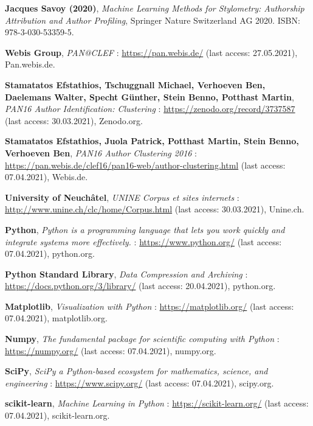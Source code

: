 \begin{thebibliography}{9}
\textbf{Jacques Savoy (2020)},
\textit{Machine Learning Methods for Stylometry: Authorship Attribution and Author Profiling},
Springer Nature Switzerland AG 2020. ISBN: 978-3-030-53359-5.


\textbf{Webis Group},
\textit{PAN@CLEF} : \url{https://pan.webis.de/} (last access: 27.05.2021),
Pan.webis.de.

\textbf{Stamatatos Efstathios, Tschuggnall Michael, Verhoeven Ben, Daelemans Walter, Specht Günther, Stein Benno, Potthast Martin},
\textit{PAN16 Author Identification: Clustering} : \url{https://zenodo.org/record/3737587} (last access: 30.03.2021),
Zenodo.org.

\textbf{Stamatatos Efstathios, Juola Patrick, Potthast Martin, Stein Benno, Verhoeven Ben},
\textit{PAN16 Author Clustering 2016} : \url{https://pan.webis.de/clef16/pan16-web/author-clustering.html} (last access: 07.04.2021),
Webis.de.

\textbf{University of Neuchâtel},
\textit{UNINE Corpus et sites internets} : \url{http://www.unine.ch/clc/home/Corpus.html} (last access: 30.03.2021),
Unine.ch.


\textbf{Python},
\textit{Python is a programming language that lets you work quickly and integrate systems more effectively.} : \url{https://www.python.org/} (last access: 07.04.2021),
python.org.

\textbf{Python Standard Library},
\textit{Data Compression and Archiving} : \url{https://docs.python.org/3/library/} (last access: 20.04.2021),
python.org.

\textbf{Matplotlib},
\textit{Visualization with Python} : \url{https://matplotlib.org/} (last access: 07.04.2021),
matplotlib.org.

\textbf{Numpy},
\textit{The fundamental package for scientific computing with Python} : \url{https://numpy.org/} (last access: 07.04.2021),
numpy.org.

\textbf{SciPy},
\textit{SciPy a Python-based ecosystem for mathematics, science, and engineering} : \url{https://www.scipy.org/} (last access: 07.04.2021),
scipy.org.

\textbf{scikit-learn},
\textit{Machine Learning in Python} : \url{https://scikit-learn.org/} (last access: 07.04.2021),
scikit-learn.org.


\end{thebibliography}
